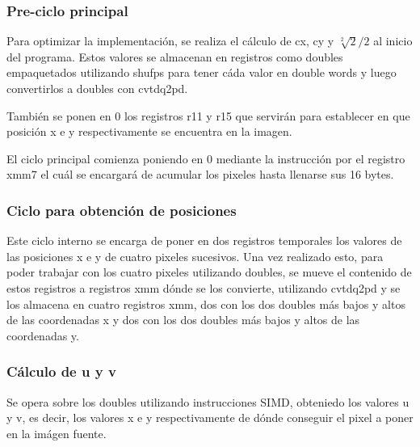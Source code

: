 \subsubsection{Pre-ciclo principal}
Para optimizar la implementación, se realiza el cálculo de cx, cy y $\sqrt[2]{2}/2$ al inicio del programa. Estos valores se almacenan en registros como doubles empaquetados utilizando shufps para tener cáda valor en double words y luego convertirlos a doubles con cvtdq2pd.

También se ponen en 0 los registros r11 y r15 que servirán para establecer en que posición x e y respectivamente se encuentra en la imagen.

El ciclo principal comienza poniendo en 0 mediante la instrucción por el registro xmm7 el cuál se encargará de acumular los pixeles hasta llenarse sus 16 bytes.

\subsubsection{Ciclo para obtención de posiciones}
Este ciclo interno se encarga de poner en dos registros temporales los valores de las posiciones x e y de cuatro pixeles sucesivos. Una vez realizado esto, para poder trabajar con los cuatro pixeles utilizando doubles, se mueve el contenido de estos registros a registros xmm dónde se los convierte, utilizando cvtdq2pd y se los almacena en cuatro registros xmm, dos con los dos doubles más bajos y altos de las coordenadas x y dos con los dos doubles más bajos y altos de las coordenadas y.

\begin{center}
\end{center}


\subsubsection{Cálculo de u y v}
Se opera sobre los doubles utilizando instrucciones SIMD, obteniedo los valores u y v, es decir, los valores x e y respectivamente de dónde conseguir el pixel a poner en la imágen fuente.

